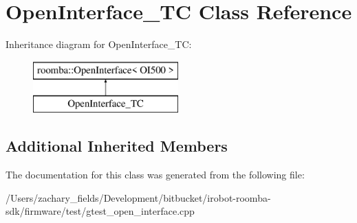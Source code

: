 \hypertarget{class_open_interface___t_c}{\section{Open\+Interface\+\_\+\+T\+C Class Reference}
\label{class_open_interface___t_c}
}
Inheritance diagram for Open\+Interface\+\_\+\+T\+C\+:\begin{figure}[H]
\begin{center}
\leavevmode
\includegraphics[height=2.000000cm]{class_open_interface___t_c}
\end{center}
\end{figure}
\subsection*{Additional Inherited Members}


The documentation for this class was generated from the following file\+:\begin{DoxyCompactItemize}
\item 
/\+Users/zachary\+\_\+fields/\+Development/bitbucket/irobot-\/roomba-\/sdk/firmware/test/gtest\+\_\+open\+\_\+interface.\+cpp\end{DoxyCompactItemize}
